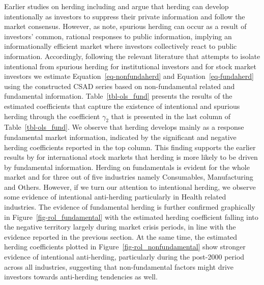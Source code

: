 \documentclass[
  letterpaper,
  DIV=11,
  numbers=noendperiod]{scrartcl}
\begin{document}
Earlier studies on herding including \citet{christie1995following} and
\citet{Bikhchandani2001} argue that herding can develop intentionally as
investors to suppress their private information and follow the market
consensus. However, as \citet{ali2023anti} note, spurious herding can
occur as a result of investors' common, rational responses to public
information, implying an informationally efficient market where
investors collectively react to public information. Accordingly,
following the relevant literature that attempts to isolate intentional
from spurious herding for institutional investors
\citep{holmes2013herding} and for stock market investors
\citep{galariotis2015herding} we estimate Equation~\ref{eq-nonfundaherd}
and Equation~\ref{eq-fundaherd} using the constructed CSAD series based
on non-fundamental related and fundamental information.
Table~\ref{tbl-ols_fund} presents the results of the estimated
coefficients that capture the existence of intentional and spurious
herding through the coefficient \(\gamma_2\) that is presented in the
last column of Table~\ref{tbl-ols_fund}. We observe that herding
develops mainly as a response fundamental market information, indicated
by the significant and negative herding coefficients reported in the top
column. This finding supports the earlier results by
\citet{choi2015institutional} for international stock markets that
herding is more likely to be driven by fundamental information. Herding
on fundamentals is evident for the whole market and for three out of
five industries namely Consumables, Manufacturing and Others. However,
if we turn our attention to intentional herding, we observe some
evidence of intentional anti-herding particularly in Health related
industries. The evidence of fundamental herding is further confirmed
graphically in Figure~\ref{fig-rol_fundamental} with the estimated
herding coefficient falling into the negative territory largely during
market crisis periods, in line with the evidence reported in the
previous section. At the same time, the estimated herding coefficients
plotted in Figure~\ref{fig-rol_nonfundamental} show stronger evidence of
intentional anti-herding, particularly during the post-2000 period
across all industries, suggesting that non-fundamental factors might
drive investors towards anti-herding tendencies as well.
\end{document}
